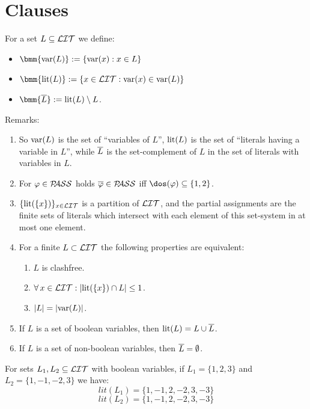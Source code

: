 \documentclass[]{book}
\begin{document}
\section{Clauses}
\label{sec:Clauses}

\begin{defi}\label{def:clauses}
      For a set $L \subseteq \mathcal{LIT}$ we define:
      \begin{itemize}
            \item $\bmm{\var(L)} := \set{\var(x) : x \in L}$
            \item $\bmm{\lit(L)} := \set{x \in \Lit : \var(x) \in \var(L)}$
            \item $\bmm{\ol{L}} := \lit(L) \sm L$.
      \end{itemize}
\end{defi}
Remarks:
\begin{enumerate}
      \item So $\operatorname{var}(L)$ is the set of ``variables of $L$'', $\operatorname{lit}(L)$ is the set of ``literals having a variable in $L$'', while $\overline{L}$ 
	  is the set-complement of $L$ in the set of literals with variables in $L$.
      \item For $\varphi \in \mathcal{P\hspace{-0.32em}ASS}$ holds $\overline{\varphi} \in \mathcal{P\hspace{-0.32em}ASS}$ iff $\dos(\vp) \sse \set{1,2}$.
      \item $\{ \operatorname{lit}(\{ x \}) \}_{x \in \mathcal{LIT}}$ is a partition of $\mathcal{LIT}$, and the partial assignments are the finite sets of literals which 
	  intersect with each element of this set-system in at most one element.
      \item For a finite $L \subset \mathcal{LIT}$ the following properties are equivalent:
      \begin{enumerate}
            \item $L$ is clashfree.
            \item $\forall\, x \in \mathcal{LIT} : \lvert \operatorname{lit}(\{ x \}) \cap L \rvert \le 1$.
            \item $\lvert L \rvert = \lvert \operatorname{var}(L) \rvert$.
      \end{enumerate}
      \item If $L$ is a set of boolean variables, then $\operatorname{lit}(L) = L \cup \overline{L}$.
      \item If $L$ is a set of non-boolean variables, then $\overline{L} = \emptyset$.
\end{enumerate}
\begin{examp}\label{exp:lit1}
      For sets $L_1, L_2 \subseteq \mathcal{LIT}$ with boolean variables, if $L_1 = \{1, 2, 3 \}$ and $L_2 = \{1, -1, -2, 3 \}$ we have:
      $$lit(L_1) = \{1, -1, 2, -2, 3, -3\}$$
      $$lit(L_2) = \{1, -1, 2, -2, 3, -3\}$$
\end{examp}
\end{document}
